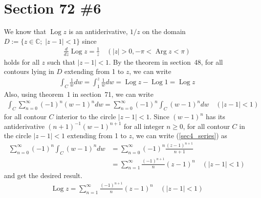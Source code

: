 \documentclass{scrartcl}
\newcommand{\Log}{\operatorname{Log}}
\newcommand{\Arg}{\operatorname{Arg}}
\begin{document}
\section{Section 72 \#6}
We know that \(\Log z\) is an antiderivative, \(1 / z\) on the domain \(D := \{z \in \mathbb{C};\; |z - 1| < 1\}\) since
\begin{align*}
  \frac{d}{dz} \Log z = \frac{1}{z} \quad (|z| > 0, -\pi < \Arg z < \pi)
\end{align*}
holds for all \(z\) such that \(|z - 1| < 1\).
By the theorem in section~48, for all contours lying in \(D\) extending from 1 to \(z\), we can write
\begin{align*}
  \int_C \frac{1}{w} dw
  = \int^z_1 \frac{1}{w} dw
  = \Log z - \Log 1
  = \Log z
\end{align*}
Also, using theorem~1 in section~71, we can write
\begin{align}
  \label{sec4_series} \int_C \sum^\infty_{n = 0} (-1)^n (w - 1)^n dw
  = \sum^\infty_{n = 0} (-1)^n \int_C (w - 1)^n dw \quad (|z - 1| < 1)
\end{align}
for all contour \(C\) interior to the circle \(|z - 1| < 1\).
Since \((w - 1)^n\) has its antiderivative \((n + 1)^{-1} (w - 1)^{n + 1}\) for all integer \(n \geq 0\), for all contour \(C\) in the circle \(|z - 1| < 1\) extending from 1 to \(z\), we can write (\ref{sec4_series}) as
\begin{align*}
  \sum^\infty_{n = 0} (-1)^n \int_C (w - 1)^n dw
  &= \sum^\infty_{n = 0} (-1)^n \frac{(z - 1)^{n + 1}}{n + 1} \\
  &= \sum^\infty_{n = 1} \frac{(-1)^{n + 1}}{n} (z - 1)^n \quad (|z - 1| < 1)
\end{align*}
and get the desired result.
\begin{align}
  \Log z = \sum^\infty_{n = 1} \frac{(-1)^{n + 1}}{n} (z - 1)^n \quad (|z - 1| < 1)
\end{align}
\end{document}
